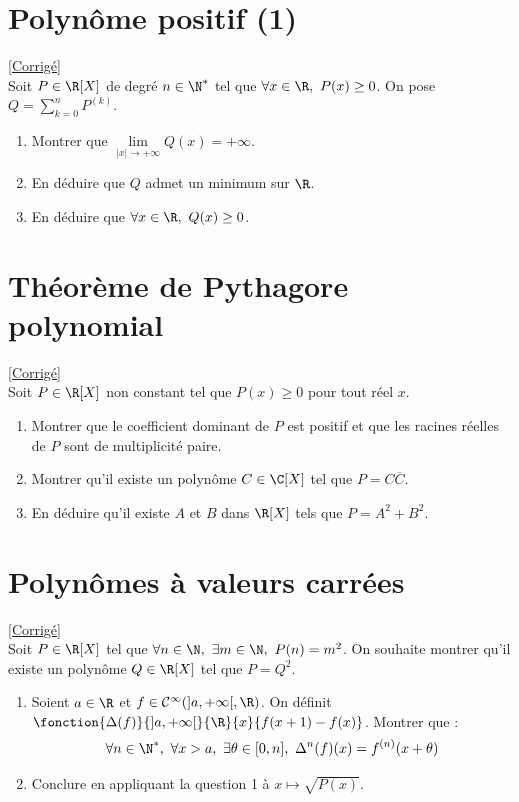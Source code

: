 \documentclass{book}
\begin{document}
	\section{Polynôme positif (1) }
	\textcolor{blue}{\hyperref[sec:polynôme-positif-(1)]{[Corrigé]}}\\
	\label{Polynôme positif (1)}
	Soit $P\in \R[X]$ de degré $n\in \N^*$ tel que $\forall x\in \R,\ P(x)\geq 0$. On pose $Q=\displaystyle\sum_{k=0}^nP^{(k)}$.
	\begin{enumerate}
		\item Montrer que $\lim\limits_{|x|\to +\infty}Q(x)=+\infty$.
		\item En déduire que $Q$ admet un minimum sur $\R$.
		\item En déduire que $\forall x\in \R,\ Q(x)\geq 0$.
	\end{enumerate}
	
	\section{Théorème de Pythagore polynomial }
	\textcolor{blue}{\hyperref[sec:théorème-de-pythagore-polynomial]{[Corrigé]}}\\
	\label{Théorème de Pythagore polynomial}
	Soit $P\in\R[X]$ non constant tel que $P(x)\geq0$ pour tout réel $x$.
	\begin{enumerate}
		\item Montrer que le coefficient dominant de $P$ est positif et que les racines réelles de $P$ sont de multiplicité paire.
		\item Montrer qu'il existe un polynôme $C\in\C[X]$ tel que $P=C\overline{C}$.
		\item En déduire qu'il existe $A$ et $B$ dans $\R[X]$ tels que $P=A^2+B^2$.
	\end{enumerate}
	
	\section{Polynômes à valeurs carrées}
	\textcolor{blue}{\hyperref[sec:polynomes-à-valeurs-carrées]{[Corrigé]}}\\
	\label{Polynômes à valeurs carrées}
	Soit $P\in \R[X]$ tel que $\forall n\in \N,\ \exists m\in \N,\ P(n)=m^2$. On souhaite montrer qu'il existe un polynôme $Q\in \R[X]$ tel que $P=Q^2$.
	\begin{enumerate}
		\item Soient $a\in \R$ et $f\in \mathcal C^{\infty}(]a,+\infty[,\R)$. On définit $\fonction{\Delta(f)}{]a,+\infty[}{\R}{x}{f(x+1)-f(x)}$. Montrer que :
		$$\forall n\in \N^*,\ \forall x>a,\ \exists \theta\in [0,n],\ \Delta^n(f)(x)=f^{(n)}(x+\theta)$$
		\item Conclure en appliquant la question 1 à $x\mapsto \sqrt{P(x)}$.
	\end{enumerate}
	
\end{document}
